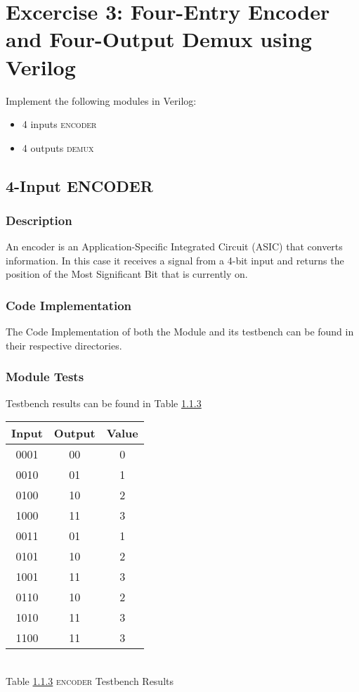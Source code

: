 \section{\color{olive}Excercise 3: Four-Entry Encoder and Four-Output Demux using Verilog}
Implement the following modules in Verilog:
\begin {itemize}
\item 4 inputs \textsc{encoder}
\item 4 outputs \textsc{demux}
\end {itemize}

\subsection{\color{purple}4-Input ENCODER}
\subsubsection{\color{orange}Description}
An encoder is an Application-Specific Integrated Circuit (ASIC) that converts information. In this case it receives a signal from  a 4-bit input and returns the position of the Most Significant Bit that is currently on.
\subsubsection{\color{orange}Code Implementation}
The Code Implementation of both the Module and its testbench can be found in their respective directories.
\subsubsection{\color{orange}Module Tests}
\label{subsec1}
Testbench results can be found in Table \ref{subsec1}
\begin{center}
\begin{tabular}{|c|c|c|}
\hline
Input&Output&Value\\
\hline
0001&00&0\\
0010&01&1\\
0100&10&2\\
1000&11&3\\
0011&01&1\\
0101&10&2\\
1001&11&3\\
0110&10&2\\
1010&11&3\\
1100&11&3\\
\hline
\end{tabular}
\\\vspace{12pt}
Table \ref{subsec1} \textsc{encoder} Testbench Results
\end{center}

